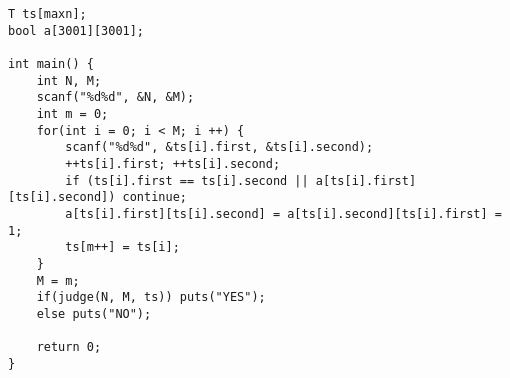 \begin{verbatim}
T ts[maxn];
bool a[3001][3001];

int main() {
    int N, M;
    scanf("%d%d", &N, &M);
    int m = 0;
    for(int i = 0; i < M; i ++) {
        scanf("%d%d", &ts[i].first, &ts[i].second);
        ++ts[i].first; ++ts[i].second;
        if (ts[i].first == ts[i].second || a[ts[i].first][ts[i].second]) continue;
        a[ts[i].first][ts[i].second] = a[ts[i].second][ts[i].first] = 1;
        ts[m++] = ts[i];
    }
    M = m;
    if(judge(N, M, ts)) puts("YES");
    else puts("NO");

    return 0;
}
\end{verbatim}
